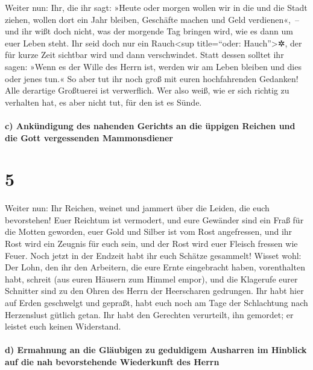  Weiter nun: Ihr, die ihr sagt: »Heute oder morgen wollen
wir in die und die Stadt ziehen, wollen dort ein Jahr bleiben, Geschäfte
machen und Geld verdienen«,~--  und ihr wißt doch nicht,
was der morgende Tag bringen wird, wie es dann um euer Leben steht. Ihr
seid doch nur ein Rauch\textless sup title=``oder: Hauch''\textgreater✲,
der für kurze Zeit sichtbar wird und dann verschwindet. 
Statt dessen solltet ihr sagen: »Wenn es der Wille des Herrn ist, werden
wir am Leben bleiben und dies oder jenes tun.«  So aber
tut ihr noch groß mit euren hochfahrenden Gedanken! Alle derartige
Großtuerei ist verwerflich.  Wer also weiß, wie er sich
richtig zu verhalten hat, es aber nicht tut, für den ist es Sünde.

\hypertarget{c-ankuxfcndigung-des-nahenden-gerichts-an-die-uxfcppigen-reichen-und-die-gott-vergessenden-mammonsdiener}{%
\paragraph{c) Ankündigung des nahenden Gerichts an die üppigen Reichen
und die Gott vergessenden
Mammonsdiener}\label{c-ankuxfcndigung-des-nahenden-gerichts-an-die-uxfcppigen-reichen-und-die-gott-vergessenden-mammonsdiener}}

\hypertarget{section-4}{%
\section{5}\label{section-4}}

 Weiter nun: Ihr Reichen, weinet und jammert über die
Leiden, die euch bevorstehen!  Euer Reichtum ist
vermodert, und eure Gewänder sind ein Fraß für die Motten geworden,
 euer Gold und Silber ist vom Rost angefressen, und ihr
Rost wird ein Zeugnis für euch sein, und der Rost wird euer Fleisch
fressen wie Feuer. Noch jetzt in der Endzeit habt ihr euch Schätze
gesammelt!  Wisset wohl: Der Lohn, den ihr den Arbeitern,
die eure Ernte eingebracht haben, vorenthalten habt, schreit (aus euren
Häusern zum Himmel empor), und die Klagerufe eurer Schnitter sind zu den
Ohren des Herrn der Heerscharen gedrungen.  Ihr habt hier
auf Erden geschwelgt und gepraßt, habt euch noch am Tage der Schlachtung
nach Herzenslust gütlich getan.  Ihr habt den Gerechten
verurteilt, ihn gemordet; er leistet euch keinen Widerstand.

\hypertarget{d-ermahnung-an-die-gluxe4ubigen-zu-geduldigem-ausharren-im-hinblick-auf-die-nah-bevorstehende-wiederkunft-des-herrn}{%
\paragraph{d) Ermahnung an die Gläubigen zu geduldigem Ausharren im
Hinblick auf die nah bevorstehende Wiederkunft des
Herrn}\label{d-ermahnung-an-die-gluxe4ubigen-zu-geduldigem-ausharren-im-hinblick-auf-die-nah-bevorstehende-wiederkunft-des-herrn}}

